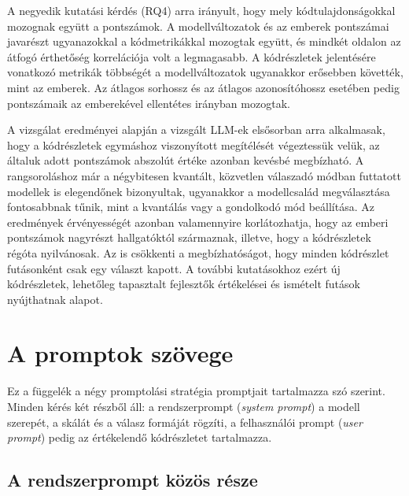 \documentclass[
]{elteikthesis}[2024/04/26]
\begin{document}
A negyedik kutatási kérdés (RQ4) arra irányult, hogy mely kódtulajdonságokkal mozognak együtt a pontszámok.
A modellváltozatok és az emberek pontszámai javarészt ugyanazokkal a kódmetrikákkal mozogtak együtt,
és mindkét oldalon az átfogó érthetőség korrelációja volt a legmagasabb.
A kódrészletek jelentésére vonatkozó metrikák többségét a modellváltozatok ugyanakkor erősebben követték, mint az emberek.
Az átlagos sorhossz és az átlagos azonosítóhossz esetében pedig pontszámaik az emberekével ellentétes irányban mozogtak.

A vizsgálat eredményei alapján a vizsgált LLM-ek elsősorban arra alkalmasak,
hogy a kódrészletek egymáshoz viszonyított megítélését végeztessük velük,
az általuk adott pontszámok abszolút értéke azonban kevésbé megbízható.
A rangsoroláshoz már a négybitesen kvantált, közvetlen válaszadó módban futtatott modellek is elegendőnek bizonyultak,
ugyanakkor a modellcsalád megválasztása fontosabbnak tűnik, mint a kvantálás vagy a gondolkodó mód beállítása.
Az eredmények érvényességét azonban valamennyire korlátozhatja,
hogy az emberi pontszámok nagyrészt hallgatóktól származnak,
illetve, hogy a kódrészletek régóta nyilvánosak.
Az is csökkenti a megbízhatóságot, hogy minden kódrészlet futásonként csak egy választ kapott.
A további kutatásokhoz ezért új kódrészletek, lehetőleg tapasztalt fejlesztők értékelései és ismételt futások nyújthatnak alapot.

\cleardoublepage











\appendix

\chapter{A promptok szövege}
\label{app:prompts}

Ez a függelék a négy promptolási stratégia promptjait tartalmazza szó szerint.
Minden kérés két részből áll: a rendszerprompt (\textit{system prompt}) a modell
szerepét, a skálát és a válasz formáját rögzíti, a felhasználói prompt
(\textit{user prompt}) pedig az értékelendő kódrészletet tartalmazza.

\section*{A rendszerprompt közös része}
\end{document}
